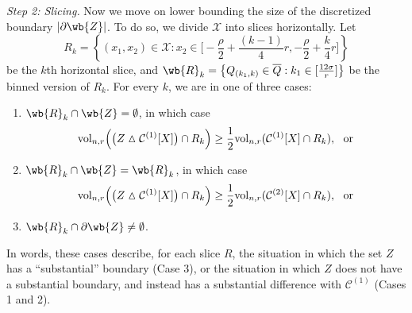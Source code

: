 \documentclass[twoside,11pt]{article}
\newcommand{\abs}[1]{\left \lvert #1 \right \rvert}
\newcommand{\set}[1]{\left\{#1\right\}}
\newcommand{\1}{\mathbf{1}}
\newcommand{\mc}[1]{\mathcal{#1}}
\newcommand{\vol}{\mathrm{vol}}
\begin{document}
\noindent \emph{Step 2: Slicing.}
Now we move on lower bounding the size of the discretized boundary $\abs{\partial\wb{Z}}$. To do so, we divide $\mathcal{X}$ into slices horizontally. Let $$R_k = \set{(x_1,x_2) \in \mathcal{X}: x_2 \in \bigl[-\frac{\rho}{2} + \frac{(k - 1)}{4}r, -\frac{\rho}{2} + \frac{k}{4}r\bigr]}$$ 
be the $k$th horizontal slice, and $\wb{R}_k = \set{Q_{(k_1,k)} \in \overline{Q}:k_1 \in [\frac{12\sigma}{r}]}$ be the binned version of $R_k$. For every $k$, we are in one of three cases:
\begin{enumerate}
	\item $\wb{R}_k \cap \wb{Z} = \emptyset$, in which case
	\begin{equation*}
	\vol_{n,r}\Bigl( \bigl(Z \vartriangle \mc{C}^{(1)}[X]\bigr) \cap R_k \Bigr) \geq \frac{1}{2}\vol_{n,r}(\mc{C}^{(1)}[X] \cap R_k), ~~ \textrm{or}
	\end{equation*}
	\item $\wb{R}_k \cap \wb{Z} = \wb{R}_k$, in which case
	\begin{equation*}
	\vol_{n,r}\Bigl( \bigl(Z \vartriangle \mc{C}^{(1)}[X]\bigr) \cap R_k \Bigr) \geq \frac{1}{2}\vol_{n,r}(\mc{C}^{(2)}[X] \cap R_k), ~~\textrm{or}
	\end{equation*}
	\item $\wb{R}_k \cap \partial \wb{Z} \neq \emptyset$.
\end{enumerate}
In words, these cases describe, for each slice $R$, the situation in which the set $Z$ has a ``substantial'' boundary (Case 3), or the situation in which $Z$ does not have a substantial boundary, and instead has a substantial difference with $\mc{C}^{(1)}$ (Cases 1 and 2). 
\end{document}

